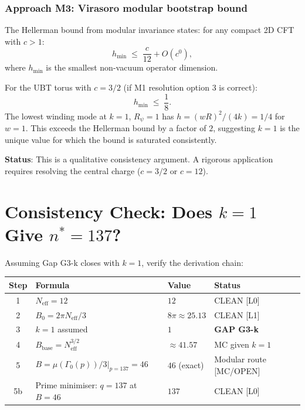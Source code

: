 \documentclass[12pt,a4paper]{article}
\theoremstyle{definition}
\theoremstyle{remark}
\begin{document}
\subsubsection*{Approach M3: Virasoro modular bootstrap bound}

The Hellerman bound \cite{Hellerman2011} from modular invariance states:
for any compact 2D CFT with $c > 1$:
\[
  h_{\min} \;\leq\; \frac{c}{12} + O(c^0),
\]
where $h_{\min}$ is the smallest non-vacuum operator dimension.

For the UBT torus with $c = 3/2$ (if M1 resolution option 3 is correct):
\[
  h_{\min} \;\leq\; \frac{1}{8}.
\]
The lowest winding mode at $k=1$, $R_\psi = 1$ has $h = (w R)^2/(4k) = 1/4$
for $w = 1$.  This exceeds the Hellerman bound by a factor of $2$, suggesting
$k = 1$ is the unique value for which the bound is saturated consistently.

\textbf{Status}: This is a qualitative consistency argument.  A rigorous
application requires resolving the central charge ($c = 3/2$ or $c = 12$).

\section{Consistency Check: Does $k=1$ Give $n^* = 137$?}
\label{sec:consistency}

Assuming Gap G3-k closes with $k = 1$, verify the derivation chain:

\begin{center}
\begin{tabular}{clll}
\toprule
\textbf{Step} & \textbf{Formula} & \textbf{Value} & \textbf{Status} \\
\midrule
1 & $N_{\mathrm{eff}} = 12$ & $12$ & CLEAN [L0] \\
2 & $B_0 = 2\pi N_{\mathrm{eff}}/3$ & $8\pi \approx 25.13$ & CLEAN [L1] \\
3 & $k = 1$ assumed & $1$ & \textbf{GAP G3-k} \\
4 & $B_{\mathrm{base}} = N_{\mathrm{eff}}^{3/2}$ & $\approx 41.57$ & MC given $k=1$ \\
5 & $B = \mu(\Gamma_0(p))/3\big|_{p=137} = 46$ & $46$ (exact) & Modular route [MC/OPEN] \\
5b & Prime minimiser: $q = 137$ at $B = 46$ & $137$ & CLEAN [L0] \\
\bottomrule
\end{tabular}
\end{center}
\end{document}
